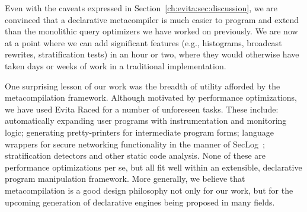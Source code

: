Even with the caveats expressed in Section~\ref{ch:evita:sec:discussion}, we are convinced that a declarative metacompiler
is much easier to program and extend than the monolithic query optimizers we have worked on previously.
We are now at a  point where we can add significant features (e.g., histograms, broadcast rewrites, 
stratification tests) in an hour or two, where they would otherwise have taken days or weeks of work
in a traditional implementation. 

One surprising lesson of our work was the breadth of utility afforded by the metacompilation framework. Although
motivated by performance optimizations, we have used Evita Raced for a number of unforeseen tasks. These
include: automatically expanding user programs with instrumentation and monitoring logic; generating pretty-printers
for intermediate program forms; language wrappers for secure networking functionality in the manner of
SecLog~\cite{abadi-netdb07}; stratification detectors and other static code analysis. None of these are performance optimizations
per se, but all fit well within an extensible, declarative program manipulation framework. More generally, we believe
that metacompilation is a good design philosophy not only for our work, but for the upcoming generation of
declarative engines being proposed in many fields. 


